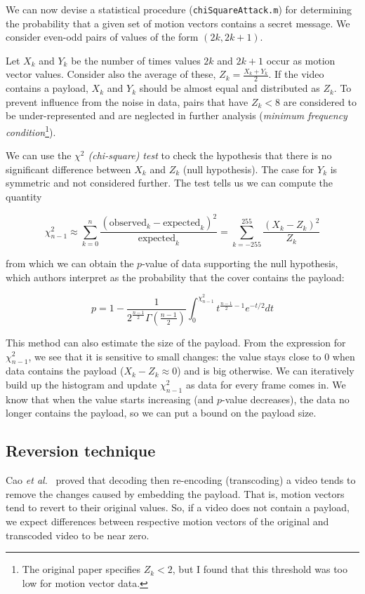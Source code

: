 \documentclass[12pt,british,twoside,notitlepage,usenames,dvipsnames,hypens,final]{report}
\numberwithin{equation}{section}
\numberwithin{figure}{section}
\begin{document}
We can now devise a statistical procedure (\texttt{chiSquareAttack.m}) for determining the probability that a given set of motion vectors contains a secret message. We consider even-odd pairs of values of the form $(2k, 2k+1)$. 

Let $X_k$ and $Y_k$ be the number of times values $2k$ and $2k+1$ occur as motion vector values. Consider also the average of these, $Z_k = \frac{X_k + Y_k}{2}$. If the video contains a payload, $X_k$ and $Y_k$ should be almost equal and distributed as $Z_k$. To prevent influence from the noise in data, pairs that have $Z_k < 8$ are considered to be under-represented and are neglected in further analysis (\emph{minimum frequency condition}\footnote{The original paper specifies $Z_k < 2$, but I found that this threshold was too low for motion vector data.}).

We can use the \emph{$\chi^2$ (chi-square) test} to check the hypothesis that there is no significant difference between $X_k$ and $Z_k$ (null hypothesis). The case for $Y_k$ is symmetric and not considered further. The test tells us we can compute the quantity

$$ \chi^2_{n-1} \approx \sum^{n}_{k=0} \frac{(\text{observed}_k - \text{expected}_k)^2}{\text{expected}_k}= \sum^{255}_{k=-255} \frac{(X_k - Z_k)^2}{Z_k} $$ 

from which we can obtain the $p$-value of data supporting the null hypothesis, which authors interpret as the probability that the cover contains the payload:

$$ p = 1 - \frac{1}{2^{\frac{n-1}{2}}\Gamma(\frac{n-1}{2})}\int_0^{\chi^2_{n-1}}t^{\frac{n-1}{2}−1}e^{-t/2}dt $$  

This method can also estimate the size of the payload. From the expression for $\chi^2_{n-1}$, we see that it is sensitive to small changes: the value stays close to 0 when data contains the payload ($X_k - Z_k \approx 0$) and is big otherwise. We can iteratively build up the histogram and update $\chi^2_{n-1}$ as data for every frame comes in. We know that when the value starts increasing (and $p$-value decreases), the data no longer contains the payload, so we can put a bound on the payload size. 

\subsection{Reversion technique}
\label{rev-tech-theory}
Cao \emph{et al.}~\cite{cao2012video} proved that decoding then re-encoding (transcoding) a video tends to remove the changes caused by embedding the payload. That is, motion vectors tend to revert to their original values. So, if a video does not contain a payload, we expect differences between respective motion vectors of the original and transcoded video to be near zero.
\end{document}
